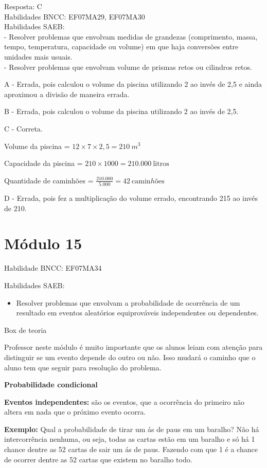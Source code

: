 Resposta: C\\
Habilidades BNCC: EF07MA29, EF07MA30\\
Habilidades SAEB:\\
- Resolver problemas que envolvam medidas de grandezas (comprimento,
massa, tempo, temperatura, capacidade ou volume) em que haja conversões
entre unidades mais usuais.\\
- Resolver problemas que envolvam volume de prismas retos ou cilindros
retos.

A - Errada, pois calculou o volume da piscina utilizando 2 ao invés de
2,5 e ainda aproximou a divisão de maneira errada.

B - Errada, pois calculou o volume da piscina utilizando 2 ao invés de
2,5.

C - Correta.

Volume da piscina = \(12 \times 7 \times 2,5 = 210\ m^{3}\ \)

Capacidade da piscina = \(210 \times 1000 = 210.000\ \text{litros}\)

Quantidade de caminhões =
\(\frac{210.000}{5.000} = 42\ \text{camin}hõ\text{es}\)

D - Errada, pois fez a multiplicação do volume errado, encontrando 215
ao invés de 210.

\section{Módulo 15}

Habilidade BNCC: EF07MA34

Habilidades SAEB:

\begin{itemize}
\tightlist
\item
  Resolver problemas que envolvam a probabilidade de ocorrência de um
  resultado em eventos aleatórios equiprováveis independentes ou
  dependentes.
\end{itemize}

Box de teoria

Professor neste módulo é muito importante que os alunos leiam com
atenção para distinguir se um evento depende do outro ou não. Isso
mudará o caminho que o aluno tem que seguir para resolução do problema.

\textbf{{Probabilidade condicional}}

\textbf{Eventos independentes:} são os eventos, que a ocorrência do
primeiro não altera em nada que o próximo evento ocorra.

\textbf{Exemplo:} Qual a probabilidade de tirar um ás de paus em um
baralho? Não há intercorrência nenhuma, ou seja, todas as cartas estão
em um baralho e só há 1 chance dentre as 52 cartas de sair um ás de
paus. Fazendo com que 1 é a chance de ocorrer dentre as 52 cartas que
existem no baralho todo.

